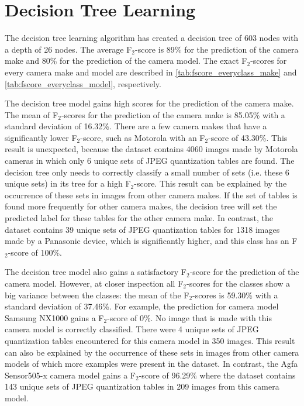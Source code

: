 \section{Decision Tree Learning}
The decision tree learning algorithm has created a decision tree of 603 nodes with a depth of 26 nodes. The average F$_2$-score is 89\% for the prediction of the camera make and 80\% for the prediction of the camera model. The exact F$_2$-scores for every camera make and model are described in \autoref{tab:fscore_everyclass_make} and \autoref{tab:fscore_everyclass_model}, respectively.

The decision tree model gains high scores for the prediction of the camera make. The mean of F$_2$-scores for the prediction of the camera make is 85.05\% with a standard deviation of 16.32\%. There are a few camera makes that have a significantly lower F$_2$-score, such as Motorola with an F$_2$-score of 43.30\%. This result is unexpected, because the dataset contains 4060 images made by Motorola cameras in which only 6 unique sets of JPEG quantization tables are found. The decision tree only needs to correctly classify a small number of sets (i.e. these 6 unique sets) in its tree for a high F$_2$-score. This result can be explained by the occurrence of these sets in images from other camera makes. If the set of tables is found more frequently for other camera makes, the decision tree will set the predicted label for these tables for the other camera make.
In contrast, the dataset contains 39 unique sets of JPEG quantization tables for 1318 images made by a Panasonic device, which is significantly higher, and this class has an F$_2$-score of 100\%.

The decision tree model also gains a satisfactory F$_2$-score for the prediction of the camera model. However, at closer inspection all F$_2$-scores for the classes show a big variance between the classes: the mean of the F$_2$-scores is 59.30\% with a standard deviation of 37.46\%. For example, the prediction for camera model Samsung NX1000 gains a F$_2$-score of 0\%. No image that is made with this camera model is correctly classified. There were 4 unique sets of JPEG quantization tables encountered for this camera model in 350 images. This result can also be explained by the occurrence of these sets in images from other camera models of which more examples were present in the dataset. In contrast, the Agfa Sensor505-x camera model gains a F$_2$-score of 96.29\% where the dataset contains 143 unique sets of JPEG quantization tables in 209 images from this camera model.

